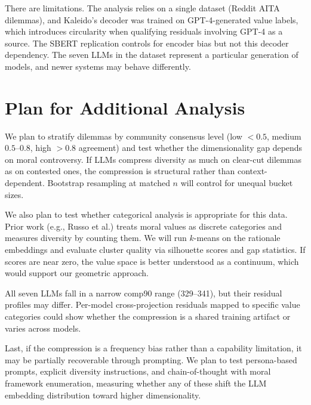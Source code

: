 \documentclass[11pt,a4paper]{article}
\begin{document}
There are limitations. The analysis relies on a single dataset (Reddit AITA dilemmas), and Kaleido's decoder was trained on GPT-4-generated value labels, which introduces circularity when qualifying residuals involving GPT-4 as a source. The SBERT replication controls for encoder bias but not this decoder dependency. The seven LLMs in the dataset represent a particular generation of models, and newer systems may behave differently.

\section{Plan for Additional Analysis}

We plan to stratify dilemmas by community consensus level (low $<0.5$, medium $0.5$--$0.8$, high $>0.8$ agreement) and test whether the dimensionality gap depends on moral controversy. If LLMs compress diversity as much on clear-cut dilemmas as on contested ones, the compression is structural rather than context-dependent. Bootstrap resampling at matched $n$ will control for unequal bucket sizes.

We also plan to test whether categorical analysis is appropriate for this data. Prior work (e.g., Russo et al.) treats moral values as discrete categories and measures diversity by counting them. We will run $k$-means on the rationale embeddings and evaluate cluster quality via silhouette scores and gap statistics. If scores are near zero, the value space is better understood as a continuum, which would support our geometric approach.

All seven LLMs fall in a narrow comp90 range (329--341), but their residual profiles may differ. Per-model cross-projection residuals mapped to specific value categories could show whether the compression is a shared training artifact or varies across models.

Last, if the compression is a frequency bias rather than a capability limitation, it may be partially recoverable through prompting. We plan to test persona-based prompts, explicit diversity instructions, and chain-of-thought with moral framework enumeration, measuring whether any of these shift the LLM embedding distribution toward higher dimensionality.
\end{document}
